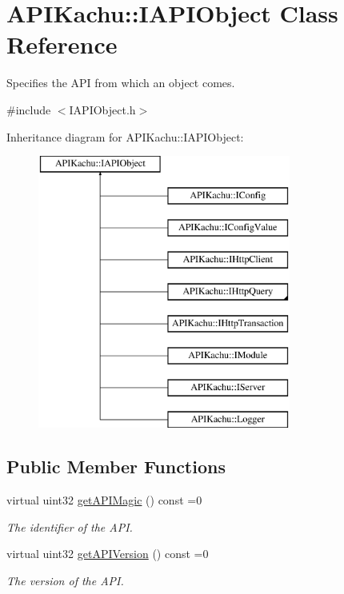 \hypertarget{class_a_p_i_kachu_1_1_i_a_p_i_object}{}\section{A\+P\+I\+Kachu\+:\+:I\+A\+P\+I\+Object Class Reference}
\label{class_a_p_i_kachu_1_1_i_a_p_i_object}


Specifies the A\+PI from which an object comes.  




{\ttfamily \#include $<$I\+A\+P\+I\+Object.\+h$>$}

Inheritance diagram for A\+P\+I\+Kachu\+:\+:I\+A\+P\+I\+Object\+:\begin{figure}[H]
\begin{center}
\leavevmode
\includegraphics[height=9.000000cm]{class_a_p_i_kachu_1_1_i_a_p_i_object}
\end{center}
\end{figure}
\subsection*{Public Member Functions}
\begin{DoxyCompactItemize}
\item 
virtual uint32 \hyperlink{class_a_p_i_kachu_1_1_i_a_p_i_object_aa7d83f55542775942b2672b6f5db5373}{get\+A\+P\+I\+Magic} () const  =0
\begin{DoxyCompactList}\small\item\em The identifier of the A\+PI. \end{DoxyCompactList}\item 
virtual uint32 \hyperlink{class_a_p_i_kachu_1_1_i_a_p_i_object_aa4517512f286043145854f22671c1f20}{get\+A\+P\+I\+Version} () const  =0
\begin{DoxyCompactList}\small\item\em The version of the A\+PI. \end{DoxyCompactList}\end{DoxyCompactItemize}


